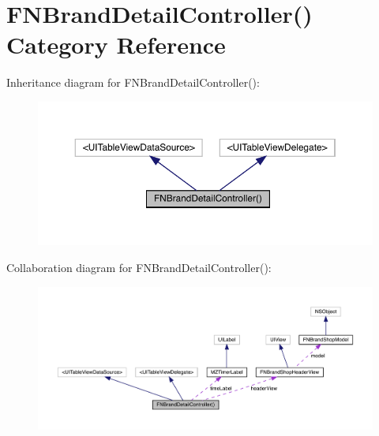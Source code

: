 \hypertarget{category_f_n_brand_detail_controller_07_08}{}\section{F\+N\+Brand\+Detail\+Controller() Category Reference}
\label{category_f_n_brand_detail_controller_07_08}


Inheritance diagram for F\+N\+Brand\+Detail\+Controller()\+:\nopagebreak
\begin{figure}[H]
\begin{center}
\leavevmode
\includegraphics[width=350pt]{category_f_n_brand_detail_controller_07_08__inherit__graph}
\end{center}
\end{figure}


Collaboration diagram for F\+N\+Brand\+Detail\+Controller()\+:\nopagebreak
\begin{figure}[H]
\begin{center}
\leavevmode
\includegraphics[width=350pt]{category_f_n_brand_detail_controller_07_08__coll__graph}
\end{center}
\end{figure}
